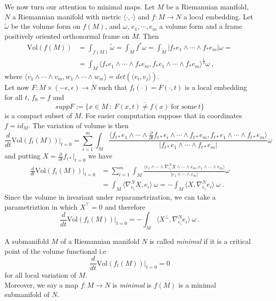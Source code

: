 We now turn our attention to minimal maps.
Let $M$ be a Riemannian manifold, $N$ a Riemannian manifold with metric $\langle \cdot, \cdot \rangle$ and $f:M \to N$ a local embedding. Let $\widetilde{\omega}$ be the volume form on $f(M)$, and $\omega$, $e_1, \cdots , e_m$ a volume form and a frame positively oriented orthonormal frame on $M$. Then
\[
\begin{split}
    \text{Vol}(f(M)) & = \int_{f(M)} \widetilde{\omega} = \int_M f^* \omega  = \int_M | f_* e_1 \wedge \cdots \wedge f_* e_m | \omega = \\
    & = \int_M \langle f_* e_1 \wedge \cdots \wedge f_* e_m ,f_* e_1 \wedge \cdots \wedge f_* e_m \rangle ^{\frac{1}{2}} \omega \ ,
\end{split}
\]
where $\langle v_1 \wedge \cdots \wedge v_m , w_1 \wedge \cdots \wedge w_m \rangle = det(\langle v_i,v_j \rangle)$.\\
Let now $F: M \times (-\epsilon, \epsilon) \to N$ such that $f_t(\cdot) = F(\cdot,t)$ is a local embedding for all $t$, $f_0 = f$ and
\[ supp F:= \overline{ \{ x\in M \ :\ F(x,t) \neq f(x) \ \text{for some} \ t\} }  \]
is a compact subset of $M$. For easier computation suppose that in coordinates $f = id_M$. The variation of volume is then
\[
    \frac{d}{dt} \text{Vol}(f_t(M)) \Big|_{t=0} = \sum_{i=1}^m \int_M \frac{ \langle f_{t*} e_1 \wedge \cdots \wedge \frac{\partial}{\partial t} f_{t*} e_i \wedge \cdots \wedge f_{t*} e_m ,f_{t*} e_1 \wedge \cdots \wedge f_{t*} e_m \rangle }{| f_{t*} e_1 \wedge \cdots \wedge f_{t*} e_m |} \omega
\]
and putting $X =\frac{\partial}{\partial t} f_{t*} |_{t=0} $ we have
\[
\begin{split}
    \frac{d}{dt} \text{Vol}(f_t(M)) \Big|_{t=0} & = \sum_{i=1}^m \int_M \frac{ \langle e_1 \wedge \cdots \wedge \nabla^N_{e_i} X \wedge \cdots \wedge e_m , e_1 \wedge \cdots \wedge e_m \rangle }{| e_1 \wedge \cdots \wedge e_m |} \omega \\
    & = \int_M \langle \nabla^N_{e_i} X, e_i \rangle \ \omega = - \int_M \langle X, \nabla^N_{e_i} e_i \rangle \ \omega \ .
\end{split}
\]
Since the volume in invariant under reparametrization, we can take a parametriztion in which $X^\top =0$ and therefore
\[
   \frac{d}{dt} \text{Vol}(f_t(M)) \Big|_{t=0}  = - \int_M \langle X^\perp, \nabla^N_{e_i} e_i \rangle \ \omega \ . 
\]
\begin{definition}
    A submanifold $M$ of a Riemannian manifold $N$ is called \textit{minimal} if it is a critical point of the volume functional i.e
    \[
        \frac{d}{dt} \text{Vol}(f_t(M)) \Big|_{t=0}  = 0
    \]
    for all local variation of $M$.\\
    Moreover, we say a map $f:M \to N$ is \textit{minimal} is $f(M)$ is a minimal submanifold of $N$.
\end{definition}
